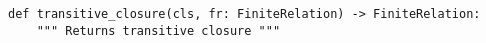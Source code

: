 \begin{verbatim}
def transitive_closure(cls, fr: FiniteRelation) -> FiniteRelation:
    """ Returns transitive closure """
\end{verbatim}